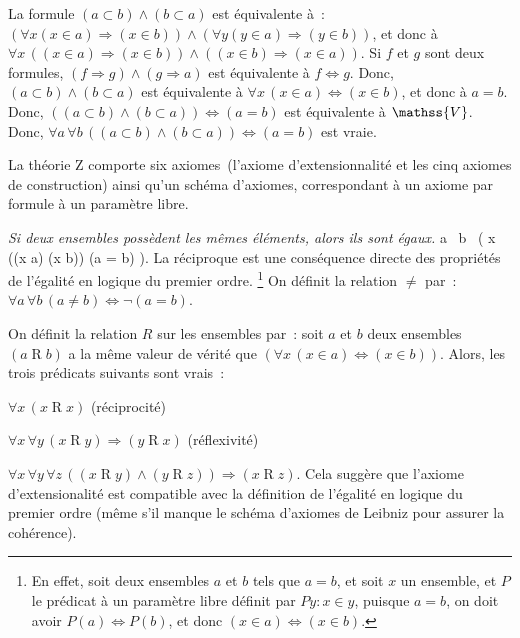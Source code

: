 \blank[medium]

\noindent{} 
    La formule $(a \subset b) \wedge (b \subset a)$ est équivalente à : $(\forall x (x \in a) \Rightarrow (x \in b)) \wedge (\forall y (y \in a) \Rightarrow (y \in b))$, et donc à $\forall x \, ((x \in a) \Rightarrow (x \in b)) \wedge ((x \in b) \Rightarrow (x \in a))$.
    Si $f$ et $g$ sont deux formules, $(f \Rightarrow g) \wedge (g \Rightarrow a)$ est équivalente à $f \Leftrightarrow g$.
    Donc, $(a \subset b) \wedge (b \subset a)$ est équivalente à $\forall x \, (x \in a) \Leftrightarrow (x \in b)$, et donc à $a = b$.
    Donc, $((a \subset b) \wedge (b \subset a)) \Leftrightarrow (a = b)$ est équivalente à $\mathss{V}$.
    Donc, $\forall a \, \forall b \, ((a \subset b) \wedge (b \subset a)) \Leftrightarrow (a = b)$ est vraie.

    \done

\blank[medium]

La théorie Z comporte six axiomes (l'axiome d'extensionnalité et les cinq axiomes de construction) ainsi qu'un schéma d'axiomes, correspondant à un axiome par formule à un paramètre libre. 

\blank[medium]

\noindent\emph{ Si deux ensembles possèdent les mêmes éléments, alors ils sont égaux.}
\startformula
    \forall a \, \forall b \, (
        \forall x \, ((x \in a) \Leftrightarrow (x \in b)) \Rightarrow (a = b)
    ). 
\stopformula
La réciproque est une conséquence directe des propriétés de l'égalité en logique du premier ordre.%
\footnote{ En effet, soit deux ensembles $a$ et $b$ tels que $a = b$, et soit $x$ un ensemble, et $P$ le prédicat à un paramètre libre définit par $P y: x \in y$, puisque $a = b$, on doit avoir $P(a) \Leftrightarrow P(b)$, et donc $(x \in a) \Leftrightarrow (x \in b)$.}
On définit la relation $\neq$ par : $\forall a \, \forall b \, (a \neq b) \Leftrightarrow \lnot (a = b)$.

\blank[medium]

\noindent{} 
    On définit la relation $R$ sur les ensembles par : soit $a$ et $b$ deux ensembles $(a \mathrel{R} b)$ a la même valeur de vérité que $(\forall x \, (x \in a) \Leftrightarrow (x \in b))$. 
    Alors, les trois prédicats suivants sont vrais :
    \startitemize[nowhite]
      \item $\forall x \, (x \mathrel{R} x)$ (réciprocité)
      \item $\forall x \, \forall y \, (x \mathrel{R} y) \Rightarrow (y \mathrel{R} x)$ (réflexivité)
      \item $\forall x \, \forall y \, \forall z \, ((x \mathrel{R} y) \wedge (y \mathrel{R} z)) \Rightarrow (x \mathrel{R} z)$.
    \stopitemize
    Cela suggère que l'axiome d'extensionalité est compatible avec la définition de l'égalité en logique du premier ordre (même s'il manque le schéma d'axiomes de Leibniz pour assurer la cohérence).

